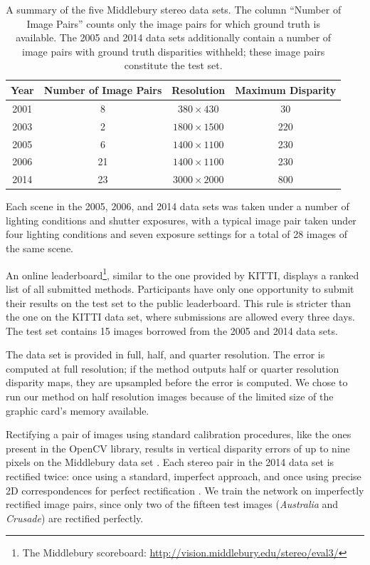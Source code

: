 \documentclass[twoside,11pt]{article}
\begin{document}
\begin{table}[tb] 
\begin{center} 
\begin{tabular}{cccc}
\toprule 
Year & Number of Image Pairs & Resolution & Maximum Disparity \\\midrule 
2001 &  8 & \(380 \times 430 \) & 30 \\ 
2003 &  2 & \(1800 \times 1500 \) & 220 \\ 
2005 &  6 & \(1400 \times 1100 \) & 230 \\ 
2006 & 21 & \(1400 \times 1100 \) & 230 \\ 
2014 & 23 & \(3000 \times 2000 \) & 800 \\\bottomrule 
\end{tabular} 
\caption{A summary of the five Middlebury stereo data sets. The column ``Number
of Image Pairs'' counts only the image pairs for which ground truth is
available. The 2005 and 2014 data sets additionally contain a number of image
pairs with ground truth disparities withheld; these image pairs constitute the test
set.}

\label{tbl:middlebury}
\end{center} 
\end{table}

Each scene in the 2005, 2006, and 2014 data sets was taken under a number of
lighting conditions and shutter exposures, with a typical image pair taken
under four lighting conditions and seven exposure settings for a total of 28
images of the same scene. 

An online leaderboard\footnote{The Middlebury scoreboard:
\url{http://vision.middlebury.edu/stereo/eval3/}}, similar to the one provided
by KITTI, displays a ranked list of all submitted methods. Participants have
only one opportunity to submit their results on the test set to the public
leaderboard. This rule is stricter than the one on the KITTI data set, where
submissions are allowed every three days. The test set contains 15 images
borrowed from the 2005 and 2014 data sets. 

The data set is provided in full, half, and quarter resolution. The error is
computed at full resolution; if the method outputs half or quarter resolution
disparity maps, they are upsampled before the error is computed. We chose to
run our method on half resolution images because of the limited size of the
graphic card's memory available.

Rectifying a pair of images using standard calibration procedures, like the
ones present in the OpenCV library, results in vertical disparity errors of up
to nine pixels on the Middlebury data set \citep{scharstein2014high}. Each
stereo pair in the 2014 data set is rectified twice: once using a standard,
imperfect approach, and once using precise 2D correspondences for perfect
rectification \citep{scharstein2014high}. We train the network on imperfectly
rectified image pairs, since only two of the fifteen test images
(\emph{Australia} and \emph{Crusade}) are rectified perfectly. 
\end{document}
